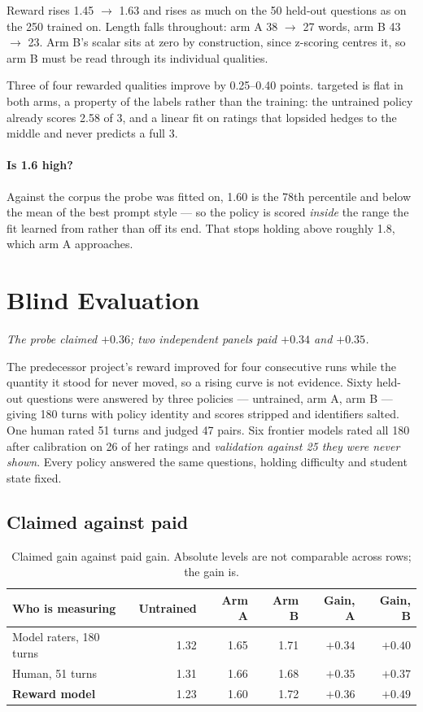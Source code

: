 \documentclass[11pt]{article}
\newcommand{\qual}[1]{\textsf{#1}}
\newcommand{\claim}[1]{\vspace{-7pt}\par{\small\itshape #1}\par\vspace{3pt}}
\begin{document}
Reward rises 1.45 $\rightarrow$ 1.63 and rises as much on the 50 held-out questions as on the 250
trained on. Length falls throughout: arm A 38 $\rightarrow$ 27 words, arm B 43 $\rightarrow$ 23. Arm
B's scalar sits at zero by construction, since z-scoring centres it, so arm B must be read through its
individual qualities.

Three of four rewarded qualities improve by 0.25--0.40 points. \qual{targeted} is flat in both arms, a
property of the labels rather than the training: the untrained policy already scores 2.58 of 3, and a
linear fit on ratings that lopsided hedges to the middle and never predicts a full 3.

\paragraph{Is 1.6 high?} Against the corpus the probe was fitted on, 1.60 is the 78th percentile and
below the mean of the best prompt style --- so the policy is scored \emph{inside} the range the fit
learned from rather than off its end. That stops holding above roughly 1.8, which arm A approaches.

\section{Blind Evaluation}
\label{sec:blind}
\claim{The probe claimed $+0.36$; two independent panels paid $+0.34$ and $+0.35$.}

The predecessor project's reward improved for four consecutive runs while the quantity it stood for
never moved, so a rising curve is not evidence. Sixty held-out questions were answered by three
policies --- untrained, arm A, arm B --- giving 180 turns with policy identity and scores stripped and
identifiers salted. One human rated 51 turns and judged 47 pairs. Six frontier models rated all 180
after calibration on 26 of her ratings and \emph{validation against 25 they were never shown}. Every
policy answered the same questions, holding difficulty and student state fixed.

\subsection{Claimed against paid}

\begin{table}[h]
\centering
\begin{tabular}{lrrrrr}
\toprule
\textbf{Who is measuring} & \textbf{Untrained} & \textbf{Arm A} & \textbf{Arm B}
& \textbf{Gain, A} & \textbf{Gain, B} \\
\midrule
Model raters, 180 turns & 1.32 & 1.65 & 1.71 & $+0.34$ & $+0.40$ \\
Human, 51 turns         & 1.31 & 1.66 & 1.68 & $+0.35$ & $+0.37$ \\
\textbf{Reward model}   & 1.23 & 1.60 & 1.72 & $\mathbf{+0.36}$ & $\mathbf{+0.49}$ \\
\bottomrule
\end{tabular}
\caption{Claimed gain against paid gain. Absolute levels are not comparable across rows; the gain is.}
\label{tab:gain}
\end{table}
\end{document}
